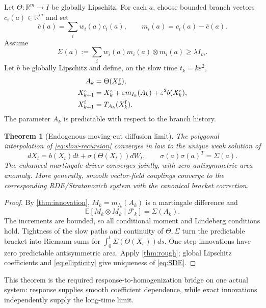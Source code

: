 \documentclass[11pt,reqno]{amsart}
\newtheorem{theorem}{Theorem}[section]
\theoremstyle{definition}
\theoremstyle{remark}
\newcommand{\E}{\mathbb E}
\newcommand{\F}{\mathcal F}
\newcommand{\R}{\mathbb R}
\begin{document}
Let $\Theta:\R^m\to I$ be globally Lipschitz.  For each $a$, choose bounded
branch vectors $c_i(a)\in\R^m$ and set
\[
 \bar c(a)=\sum_iw_i(a)c_i(a),
 \qquad m_i(a)=c_i(a)-\bar c(a).
\]
Assume
\begin{equation}\label{eq:ellipticity}
 \Sigma(a):=\sum_iw_i(a)m_i(a)\otimes m_i(a)
 \ge\lambda I_m.
\end{equation}
Let $b$ be globally Lipschitz and define, on the slow time
$t_k=k\varepsilon^2$,
\begin{align}
 A_k&=\Theta(X_k^\varepsilon),\label{eq:Ak}\\
 X_{k+1}^\varepsilon&=X_k^\varepsilon
 +\varepsilon m_{I_k}(A_k)+\varepsilon^2b(X_k^\varepsilon),
 \label{eq:slow-recursion}\\
 X_{k+1}^{\rm f}&=T_{A_k}(X_k^{\rm f}).
\end{align}
The parameter $A_k$ is predictable with respect to the branch history.

\begin{theorem}[Endogenous moving-cut diffusion limit]\label{thm:homogenization}
The polygonal interpolation of \eqref{eq:slow-recursion} converges in law to
the unique weak solution of
\begin{equation}\label{eq:SDE}
 dX_t=b(X_t)dt+\sigma(\Theta(X_t))dW_t,
 \qquad \sigma(a)\sigma(a)^T=\Sigma(a).
\end{equation}
The enhanced martingale driver converges jointly, with zero antisymmetric area
anomaly.  More generally, smooth vector-field couplings converge to the
corresponding RDE/Stratonovich system with the canonical bracket correction.
\end{theorem}

\begin{proof}
By \cref{thm:innovation},
$M_k=m_{I_k}(A_k)$ is a martingale difference and
\[
 \E[M_k\otimes M_k\mid\F_k]=\Sigma(A_k).
\]
The increments are bounded, so all conditional moment and Lindeberg conditions
hold.  Tightness of the slow paths and continuity of $\Theta,\Sigma$ turn the
predictable bracket into Riemann sums for
$\int_0^t\Sigma(\Theta(X_s))ds$.  One-step innovations have zero predictable
antisymmetric area.  Apply \cref{thm:rough}; global Lipschitz coefficients and
\eqref{eq:ellipticity} give uniqueness of \eqref{eq:SDE}.
\end{proof}

This theorem is the required response-to-homogenization bridge on one actual
system: response supplies smooth coefficient dependence, while exact
innovations independently supply the long-time limit.
\end{document}
